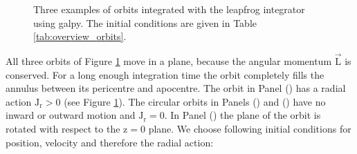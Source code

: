 \begin{figure}
\centering
{}
\hfill
{}
\hfill
{}

\caption{Three examples of orbits integrated with the leapfrog integrator using galpy. The initial conditions are given in Table \ref{tab:overview_orbits}.}
\label{fig:orbits}
\end{figure}

All three orbits of Figure \ref{fig:orbits} move in a plane, because the angular momentum $\vec{\mathrm{L}}$ is conserved. For a long enough integration time the orbit completely fills the annulus between its pericentre and apocentre. The orbit in Panel () has a radial action $\mathrm{J_r>0}$ (see Figure \ref{fig:orbits}). The circular orbits in Panels () and () have no inward or outward motion and $\mathrm{J_r=0}$. In Panel () the plane of the orbit is rotated with respect to the z$=0$ plane.  
We choose following initial conditions for position, velocity and therefore the radial action:

